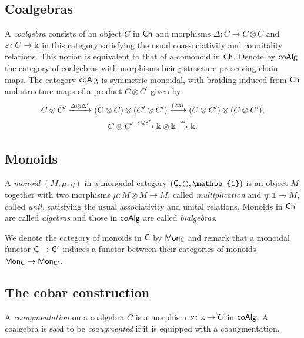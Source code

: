 \subsection{Coalgebras} \label{ss:coalgebras}

A \textit{coalgebra} consists of an object $C$ in $\mathsf{Ch}$ and morphisms $\Delta \colon C \to C \otimes C$ and $\varepsilon \colon C \to \Bbbk$ in this category satisfying the usual coassociativity and counitality relations.
This notion is equivalent to that of a comonoid in $\mathsf{Ch}$.
Denote by $\mathsf{coAlg}$ the category of coalgebras with morphisms being structure preserving chain maps.
The category $\mathsf{coAlg}$ is symmetric monoidal, with braiding induced from $\mathsf{Ch}$ and structure maps of a product $C \otimes C^\prime$ given by
\begin{gather*}
C \otimes C^\prime \xrightarrow{\Delta \otimes \Delta^\prime}
(C \otimes C) \otimes (C^\prime \otimes C^\prime) \xrightarrow{(23)}
(C \otimes C^\prime) \otimes (C \otimes C^\prime), \\
C \otimes C^\prime \xrightarrow{\varepsilon \otimes \varepsilon^\prime}
\Bbbk \otimes \Bbbk \xrightarrow{\cong} \Bbbk.
\end{gather*}

\subsection{Monoids}

A \textit{monoid} $(M, \mu, \eta)$ in a monoidal category $(\sC, \otimes, \mathbb{1})$ is an object $M$ together with two morphisms $\mu \colon M \otimes M \to M$, called \textit{multiplication} and $\eta \colon \mathbb{1} \to M$, called \textit{unit}, satisfying the usual associativity and unital relations.
Monoids in $\mathsf{Ch}$ are called \textit{algebras} and those in $\mathsf{coAlg}$ are called \textit{bialgebras}.

We denote the category of monoids in $\mathsf{C}$ by $\mathsf{Mon}_{\mathsf{C}}$ and remark that a monoidal functor $\mathsf{C} \to \mathsf{C}^\prime$ induces a functor between their categories of monoids $\mathsf{Mon}_{\mathsf{C}} \to \mathsf{Mon}_{\mathsf{C}^\prime}$.

\subsection{The cobar construction} \label{ss:cobar construction}

A \textit{coaugmentation} on a coalgebra $C$ is a morphism $\nu \colon \Bbbk \to C$ in $\mathsf{coAlg}$.
A coalgebra is said to be \textit{coaugmented} if it is equipped with a coaugmentation.

